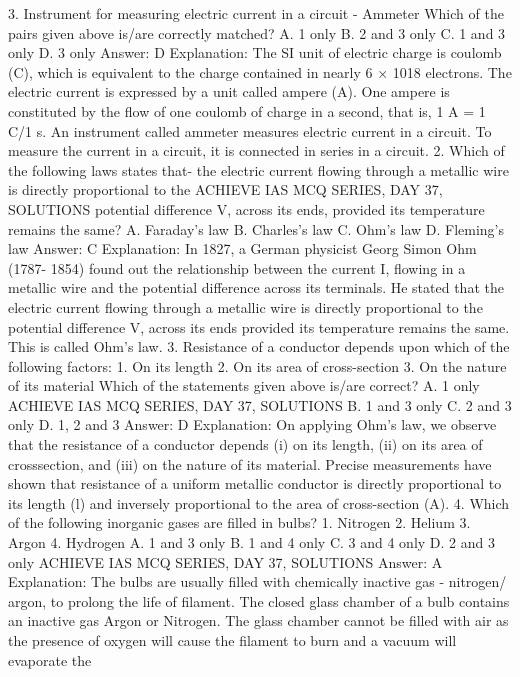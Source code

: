 3. Instrument for measuring electric current in a circuit - Ammeter
Which of the pairs given above is/are correctly matched?
A. 1 only
B. 2 and 3 only
C. 1 and 3 only
D. 3 only
Answer: D
Explanation: The SI unit of electric charge is coulomb (C), which is
equivalent to the charge contained in nearly 6 × 1018 electrons.
The electric current is expressed by a unit called ampere (A). One
ampere is constituted by the flow of one coulomb of charge in a
second, that is, 1 A = 1 C/1 s.
An instrument called ammeter measures electric current in a circuit.
To measure the current in a circuit, it is connected in series in a
circuit.
2. Which of the following laws states that- the electric current
flowing through a metallic wire is directly proportional to the
ACHIEVE IAS MCQ SERIES, DAY 37, SOLUTIONS
potential difference V, across its ends, provided its temperature
remains the same?
A. Faraday's law
B. Charles’s law
C. Ohm’s law
D. Fleming's law
Answer: C
Explanation: In 1827, a German physicist Georg Simon Ohm (1787-
1854) found out the relationship between the current I, flowing in a
metallic wire and the potential difference across its terminals. He
stated that the electric current flowing through a metallic wire is
directly proportional to the potential difference V, across its ends
provided its temperature remains the same. This is called Ohm’s law.
3. Resistance of a conductor depends upon which of the following
factors:
1. On its length
2. On its area of cross-section
3. On the nature of its material
Which of the statements given above is/are correct?
A. 1 only
ACHIEVE IAS MCQ SERIES, DAY 37, SOLUTIONS
B. 1 and 3 only
C. 2 and 3 only
D. 1, 2 and 3
Answer: D
Explanation: On applying Ohm’s law, we observe that the resistance
of a conductor depends (i) on its length, (ii) on its area of crosssection, and (iii) on the nature of its material. Precise measurements
have shown that resistance of a uniform metallic conductor is
directly proportional to its length (l) and inversely proportional to
the area of cross-section (A).
4. Which of the following inorganic gases are filled in bulbs?
1. Nitrogen
2. Helium
3. Argon
4. Hydrogen
A. 1 and 3 only
B. 1 and 4 only
C. 3 and 4 only
D. 2 and 3 only
ACHIEVE IAS MCQ SERIES, DAY 37, SOLUTIONS
Answer: A
Explanation: The bulbs are usually filled with chemically inactive gas
- nitrogen/ argon, to prolong the life of filament. The closed glass
chamber of a bulb contains an inactive gas Argon or Nitrogen. The
glass chamber cannot be filled with air as the presence of oxygen
will cause the filament to burn and a vacuum will evaporate the
